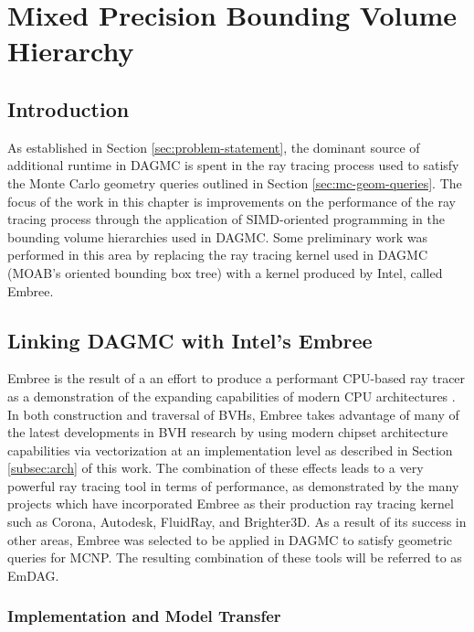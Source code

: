 
\chapter{Mixed Precision Bounding Volume Hierarchy}\label{ch:simd_bvh}

\section{Introduction}

As established in Section \ref{sec:problem-statement}, the dominant source of
additional runtime in DAGMC is spent in the ray tracing process used to satisfy
the Monte Carlo geometry queries outlined in Section \ref{sec:mc-geom-queries}.
The focus of the work in this chapter is improvements on the performance of the
ray tracing process through the application of SIMD-oriented programming in the
bounding volume hierarchies used in DAGMC. Some preliminary work was performed
in this area by replacing the ray tracing kernel used in DAGMC (MOAB's oriented
bounding box tree) with a kernel produced by Intel, called Embree.

\section{Linking DAGMC with Intel's Embree}\label{sec:embree}

Embree is the result of a an effort to produce a performant CPU-based ray tracer
as a demonstration of the expanding capabilities of modern CPU architectures
\cite{Wald_2014}. In both construction and traversal of BVHs, Embree takes
advantage of many of the latest developments in BVH research by using modern
chipset architecture capabilities via vectorization at an implementation level
as described in Section \ref{subsec:arch} of this work. The combination of these
effects leads to a very powerful ray tracing tool in terms of performance, as
demonstrated by the many projects which have incorporated Embree as their
production ray tracing kernel such as Corona, Autodesk, FluidRay, and
Brighter3D. As a result of its success in other areas, Embree was selected to be
applied in DAGMC to satisfy geometric queries for MCNP. The resulting
combination of these tools will be referred to as EmDAG.

\subsection{Implementation and Model Transfer}\label{sec:emdag_transfer}

